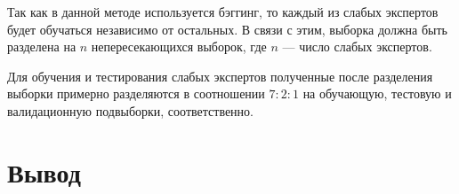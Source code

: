 Так как в данной методе используется бэггинг, то каждый из слабых экспертов будет обучаться независимо от остальных. В связи с этим, выборка должна быть разделена на $n$ непересекающихся выборок, где $n$ --- число слабых экспертов.

Для обучения и тестирования слабых экспертов полученные после разделения выборки примерно разделяются в соотношении $7:2:1$ на обучающую, тестовую и валидационную подвыборки, соответственно.

\section{Вывод}
